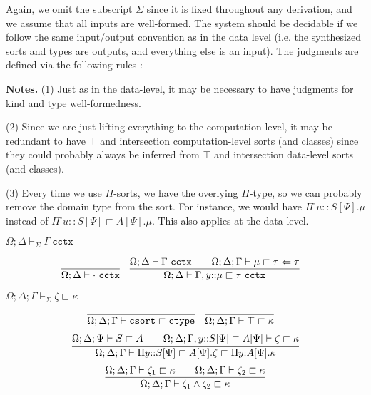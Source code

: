 \documentclass[letterpaper, 11pt]{article}
\newcommand{\Lar}{\Leftarrow}
\newcommand{\ctype}{\texttt{ctype}}
\newcommand{\csort}{\texttt{csort}}
\newcommand{\cctx}{\texttt{cctx}}
\begin{document}
    Again, we omit the subscript $\Sigma$ since it is fixed throughout any derivation, and we assume that all inputs are well-formed.  The system should
    be decidable if we follow the same input/output convention as in the data level (i.e. the synthesized sorts and types are outputs, and everything else
    is an input).  The judgments are defined via the following rules :

    \textbf{Notes.} (1) Just as in the data-level, it may be necessary to have judgments for kind and type well-formedness.

    (2) Since we are just lifting everything to the computation level, it may be redundant to have $\top$ and intersection computation-level sorts (and 
    classes) since they could probably always be inferred from $\top$ and intersection data-level sorts (and classes).

    (3) Every time we use $\Pi$-sorts, we have the overlying $\Pi$-type, so we can probably remove the domain type from the sort.  For instance, we would 
    have $\Pi^\square u{::}S[\Psi]. \mu$ instead of $\Pi^\square u{::}S[\Psi] \sqsubset A[\Psi]. \mu$.  This also applies at the data level.

    $\boxed{\Omega; \Delta \vdash_\Sigma \Gamma \ \cctx}$
    
    \begin{align*}
      & \infer{\Omega; \Delta \vdash \cdot \ \cctx}{} &
      & \infer{\Omega; \Delta \vdash \Gamma, y{::}\mu \sqsubset \tau \ \cctx}
        {
          \Omega; \Delta \vdash \Gamma \ \cctx
          &&
          \Omega; \Delta; \Gamma \vdash \mu \sqsubset \tau \Lar \tau
        }
    \end{align*}

    $\boxed{\Omega; \Delta; \Gamma \vdash_\Sigma \zeta \sqsubset \kappa}$
    
    \begin{align*}
      & \infer{\Omega; \Delta; \Gamma \vdash \csort \sqsubset \ctype}{} &
      & \infer{\Omega; \Delta; \Gamma \vdash \top \sqsubset \kappa}{}
    \end{align*}
    \begin{align*}
      \infer{\Omega; \Delta; \Gamma \vdash \Pi y{::}S[\Psi] \sqsubset A[\Psi]. \zeta \sqsubset \Pi y{:}A[\Psi]. \kappa}
            {
              \Omega; \Delta; \Psi \vdash S \sqsubset A
              &&
              \Omega; \Delta; \Gamma, y{::}S[\Psi] \sqsubset A[\Psi] \vdash \zeta \sqsubset \kappa
            }
    \end{align*}    
    \begin{align*}
      \infer{\Omega; \Delta; \Gamma \vdash \zeta_1 \land \zeta_2 \sqsubset \kappa}
            {
              \Omega; \Delta; \Gamma \vdash \zeta_1 \sqsubset \kappa
              &&
              \Omega; \Delta; \Gamma \vdash \zeta_2 \sqsubset \kappa
            }
    \end{align*}
\end{document}
